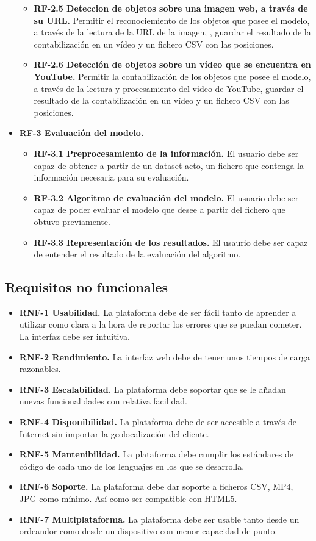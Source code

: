 \begin{itemize}
\begin{itemize}
      \item \textbf{RF-2.5 Deteccion de objetos sobre una imagen web, a través de su URL.} Permitir el reconociemiento de los objetos que posee el modelo, a través de la lectura de la URL de la imagen, , guardar el resultado de la contabilización en un vídeo y un fichero CSV con las posiciones.
      \item \textbf{RF-2.6 Detección de objetos sobre un vídeo que se encuentra en YouTube.} Permitir la contabilización de los objetos que posee el modelo, a través de la lectura y procesamiento del vídeo de YouTube, guardar el resultado de la contabilización en un vídeo y un fichero CSV con las posiciones.  
    \end{itemize}
    \item \textbf{RF-3 Evaluación del modelo.}
    \begin{itemize}
      \item \textbf{RF-3.1 Preprocesamiento de la información.} El usuario debe ser capaz de obtener a partir de un dataset acto, un fichero que contenga la información necesaria para su evaluación.
      \item \textbf{RF-3.2 Algoritmo de evaluación del modelo.} El usuario debe ser capaz de poder evaluar el modelo que desee a partir del fichero que obtuvo previamente.
      \item \textbf{RF-3.3 Representación de los resultados.} El usaurio debe ser capaz de entender el resultado de la evaluación del algoritmo.
    \end{itemize}
\end{itemize}

\subsection{Requisitos no funcionales}
\begin{itemize}
\item \textbf{RNF-1 Usabilidad.} La plataforma debe de ser fácil tanto de aprender a utilizar como clara a la hora de reportar los errores que se puedan cometer. La interfaz debe ser intuitiva.
\item \textbf{RNF-2 Rendimiento.} La interfaz web debe de tener unos tiempos de carga razonables.
\item \textbf{RNF-3 Escalabilidad.} La plataforma debe soportar que se le añadan nuevas funcionalidades con relativa facilidad.
\item \textbf{RNF-4 Disponibilidad.} La plataforma debe de ser accesible a través de Internet sin importar la geolocalización del cliente.
\item \textbf{RNF-5 Mantenibilidad.} La plataforma debe cumplir los estándares de código de cada uno de los lenguajes en los que se desarrolla. 
\item \textbf{RNF-6 Soporte.} La plataforma debe dar soporte a ficheros CSV, MP4, JPG como mínimo. Así como ser compatible con HTML5.
\item \textbf{RNF-7 Multiplataforma.} La plataforma debe ser usable tanto desde un ordeandor como desde un dispositivo con menor capacidad de punto.
\end{itemize}

